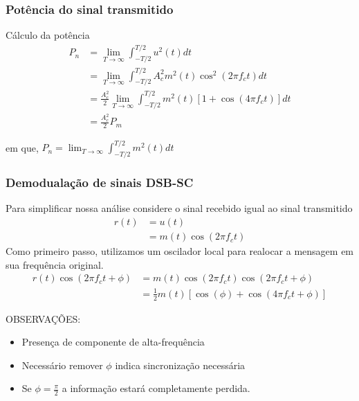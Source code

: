 \documentclass[10pt,hyperref={pdfpagemode=FullScreen},aspectratio=169]{beamer}
\begin{document}
\begin{frame}
  \frametitle{ Potência do sinal transmitido}
\begin{block}{Cálculo da potência}
  \begin{align}
    P_n & = \lim _ {T \rightarrow \infty} \int _{-T/2}^{T/2} u^2(t) dt \nonumber \\
       &=  \lim _ {T \rightarrow \infty} \int _{-T/2}^{T/2} A_c^2 m^2(t)\cos^2(2\pi f_c t)  dt \nonumber \\
       &= \frac{A_c^2}{2} \lim _ {T \rightarrow \infty} \int _{-T/2}^{T/2}  m^2(t)[1 + \cos(4\pi f_c t)]dt \nonumber \\
       &=  \frac{A_c^2}{2} P_m
   \end{align}
  
  em que, $P_n = \lim _ {T \rightarrow \infty} \int _{-T/2}^{T/2} m^2(t)dt$
\end{block}
 
\end{frame}


\begin{frame}
  \frametitle{ Demodualação de sinais DSB-SC}

Para simplificar nossa análise considere o sinal recebido igual ao sinal transmitido 
\begin{align}
  r(t) &= u(t) \nonumber \\
       &= m(t)\cos(2\pi f_c t) \nonumber 
\end{align}
Como primeiro passo, utilizamos um oscilador local para realocar a mensagem em sua frequência original.
\begin{align}
  r(t)\cos(2\pi f_c t + \phi) & =  m(t)\cos(2\pi f_c t) \cos(2\pi f_c t + \phi)  \nonumber  \\ 
   & =  \frac{1}{2}m(t)[\cos(\phi) + \cos(4\pi f_c t + \phi)] \nonumber 
\end{align}

\begin{block}{OBSERVAÇÕES:}
  \begin{itemize}
    \item   Presença de componente de alta-frequência
    \item Necessário remover $\phi$ indica sincronização necessária
    \item  Se $\phi = \frac{\pi}{2}$ a informação estará completamente perdida.
  \end{itemize}
\end{block}

\end{frame}
\end{document}
